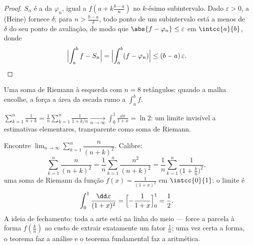 \begin{proof}
$S_n$ é a  da  $\varphi_n$, igual a
$f(a + k\frac{b-a}{n})$ no $k$-ésimo subintervalo. Dado
$\varepsilon > 0$, a  (Heine) fornece $\delta$; para
$n > \frac{b-a}{\delta}$, todo ponto de um subintervalo está a menos de
$\delta$ do seu ponto de avaliação, de modo que $\abs{f - \varphi_n} \leq
\varepsilon$ em $\intcc{a}{b}$, donde
\[
\Bigl| \int_a^b f - S_n \Bigr|
= \Bigl| \int_a^b (f - \varphi_n) \Bigr|
\leq (b-a)\,\varepsilon . \qedhere
\]
\end{proof}

\begin{omfigure}

{\small Uma soma de Riemann à esquerda com $n = 8$ retângulos: quando a
malha encolhe, a  força a área da escada rumo a
$\int_a^b f$.}
\end{omfigure}

\begin{example}\label{ex:b1:integration:riemannexample}
$\displaystyle\sum_{k=1}^{n} \frac{1}{n + k} = \frac 1n
\sum_{k=1}^{n} \frac{1}{1 + k/n} \xrightarrow[n\to\infty]{}
\int_0^1 \frac{\dd x}{1 + x} = \ln 2$: um limite invisível a estimativas
elementares, transparente como soma de Riemann.
\end{example}

\begin{example}\label{ex:b1:integration:riemann2}
Encontre $\lim_{n\to\infty} \sum_{k=1}^{n} \dfrac{n}{(n+k)^2}$.
Calibre:
\[
\sum_{k=1}^{n} \frac{n}{(n+k)^2}
= \frac{1}{n}\sum_{k=1}^{n} \frac{n^2}{(n+k)^2}
= \frac1n \sum_{k=1}^{n} \frac{1}{\bigl(1 + \frac kn\bigr)^2} ,
\]
uma soma de Riemann da função  $f(x) = \frac{1}{(1+x)^2}$ em
$\intcc{0}{1}$: o limite é
\[
\int_0^1 \frac{\dd x}{(1 + x)^2}
= \Bigl[-\frac{1}{1+x}\Bigr]_0^1 = \frac12 .
\]
A ideia de fechamento: toda a arte está na linha do meio ---
force a parcela à forma $f(\frac kn)$ ao custo de
extrair exatamente um fator $\frac1n$; uma vez certa a forma,
o teorema faz a análise e o teorema fundamental
faz a aritmética.
\end{example}

